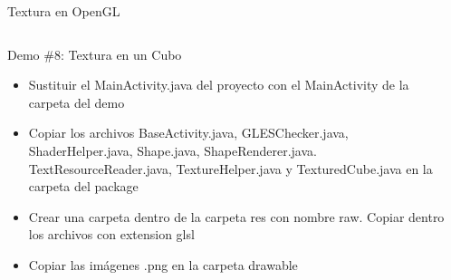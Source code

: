 \documentclass[aspectratio=169,compress]{beamer}
\begin{document}
\begin{frame}{Textura en OpenGL}
\begin{columns}
\begin{column}{0.7\textwidth}
\begin{block}{Demo \#8: Textura en un Cubo}
\begin{itemize}
\item Sustituir el MainActivity.java del proyecto con el MainActivity de la carpeta del demo
\item Copiar los archivos BaseActivity.java, GLESChecker.java, ShaderHelper.java, Shape.java, ShapeRenderer.java. TextResourceReader.java, TextureHelper.java y TexturedCube.java en la carpeta del package
\item Crear una carpeta dentro de la carpeta res con nombre raw. Copiar dentro los archivos con extension glsl
\item Copiar las imágenes .png en la carpeta drawable 
\end{itemize}
\end{block}
\end{column}
\begin{column}{0.3\textwidth}
\begin{center}

\end{center}
\end{column}
\end{columns}
\end{frame}
\end{document}
